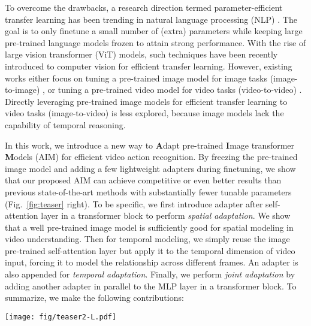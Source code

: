 \documentclass{article} \usepackage{iclr2023_conference,times}
\begin{document}
	To overcome the drawbacks, a research direction termed parameter-efficient transfer learning has been trending in natural language processing (NLP) \citep{adapter, prompttuning, ben-zaken-etal-2022-bitfit,hu2022lora}. 
	The goal is to only finetune a small number of (extra) parameters while keeping large pre-trained language models \citep{devlin2018bert, gpt} frozen to attain strong performance. 
	With the rise of large vision transformer (ViT) models, such techniques have been recently introduced to computer vision for efficient transfer learning. 
	However, existing works either focus on tuning a pre-trained image model for image tasks (image-to-image) \citep{visualpixelprompt, convadapter, vpt}, or tuning a pre-trained video model for video tasks (video-to-video) \citet{chen2022adaptformer}. 
	Directly leveraging pre-trained image models for efficient transfer learning to video tasks (image-to-video) is less explored, because image models lack the capability of temporal reasoning.
	
	


	




	In this work, we introduce a new way to \textbf{A}dapt pre-trained \textbf{I}mage transformer \textbf{M}odels (AIM) for efficient video action recognition.
	By freezing the pre-trained image model and adding a few lightweight adapters \citep{adapter} during finetuning, we show that our proposed AIM can achieve competitive or even better results than previous state-of-the-art methods with substantially fewer tunable parameters (Fig.\ \ref{fig:teaser} right). 
	To be specific, we first introduce adapter after self-attention layer in a transformer block to perform \textit{spatial adaptation}. We show that a well pre-trained image model is sufficiently good for spatial modeling in video understanding.
	Then for temporal modeling, we simply reuse the image pre-trained self-attention layer but apply it to the temporal dimension of video input, forcing it to model the relationship across different frames.
	An adapter is also appended for \textit{temporal adaptation}. 
	Finally, we perform \textit{joint adaptation} by adding another adapter in parallel to the MLP layer in a transformer block.
To summarize, we make the following contributions:
	
	
	
	\begin{figure*}[t]
		\vspace{-5pt}
		\centering
		\texttt{[image: fig/teaser2-L.pdf]}
		\vspace{-6pt}
		\caption{\textbf{Left}: Pipeline comparison between traditional full finetuning  and our efficient finetuning. \textbf{Right}: Performance comparison on K400 dataset \citep{kay2017kinetics}. Bubble size indicates GFLOPS at inference time. Our proposed AIM achieves the highest accuracy while enjoying significantly less number of tunable parameters and GFLOPS.}
		\label{fig:teaser}
	\end{figure*}
	
\end{document}
